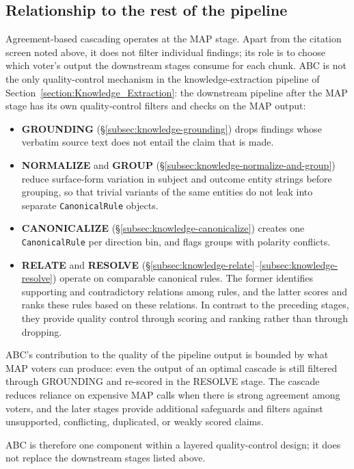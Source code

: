 \subsection{Relationship to the rest of the pipeline}\label{subsec:abc-relationship-to-pipeline}

Agreement-based cascading operates at the MAP stage. Apart from the citation screen noted above, it does not filter individual findings; its role is to choose which voter's output the downstream stages consume for each chunk. ABC is not the only quality-control mechanism in the knowledge-extraction pipeline of Section~\ref{section:Knowledge_Extraction}: the downstream pipeline after the MAP stage has its own quality-control filters and checks on the MAP output: 

\begin{itemize}[label={},leftmargin=1.5em]
    \item \textbf{GROUNDING} (§\ref{subsec:knowledge-grounding}) drops findings whose verbatim source text does not entail the claim that is made.
    
    \item \textbf{NORMALIZE} and \textbf{GROUP} (§\ref{subsec:knowledge-normalize-and-group}) reduce surface-form variation in subject and outcome entity strings before grouping, so that trivial variants of the same entities do not leak into separate \texttt{CanonicalRule} objects. 
    
    \item \textbf{CANONICALIZE} (§\ref{subsec:knowledge-canonicalize}) creates one \texttt{CanonicalRule} per direction bin, and flags groups with polarity conflicts.

    \item \textbf{RELATE} and \textbf{RESOLVE} (§\ref{subsec:knowledge-relate}--\ref{subsec:knowledge-resolve}) operate on comparable canonical rules. The former identifies supporting and contradictory relations among rules, and the latter scores and ranks these rules based on these relations. In contrast to the preceding stages, they provide quality control through scoring and ranking rather than through dropping.
\end{itemize}

ABC's contribution to the quality of the pipeline output is bounded by what MAP voters can produce: even the output of an optimal cascade is still filtered through GROUNDING and re-scored in the RESOLVE stage. The cascade reduces reliance on expensive MAP calls when there is strong agreement among voters, and the later stages provide additional safeguards and filters against unsupported, conflicting, duplicated, or weakly scored claims. 

ABC is therefore one component within a layered quality-control design; it does not replace the downstream stages listed above.